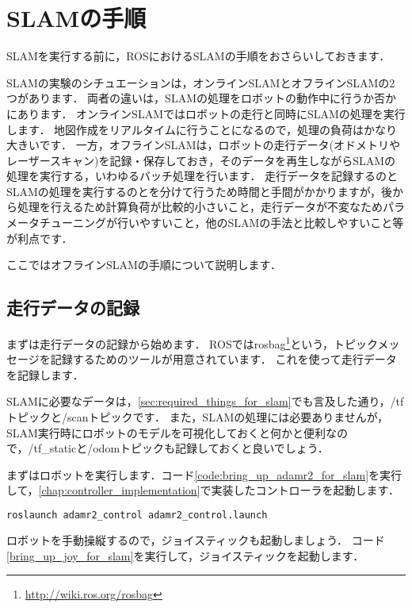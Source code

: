 \documentclass[{../../master}]{subfiles}
\begin{document}
\section{SLAMの手順}

SLAMを実行する前に，ROSにおけるSLAMの手順をおさらいしておきます．

SLAMの実験のシチュエーションは，オンラインSLAMとオフラインSLAMの2つがあります．
両者の違いは，SLAMの処理をロボットの動作中に行うか否かにあります．
オンラインSLAMではロボットの走行と同時にSLAMの処理を実行します．
地図作成をリアルタイムに行うことになるので，処理の負荷はかなり大きいです．
一方，オフラインSLAMは，ロボットの走行データ(オドメトリやレーザースキャン)を記録・保存しておき，そのデータを再生しながらSLAMの処理を実行する，いわゆるバッチ処理を行います．
走行データを記録するのとSLAMの処理を実行するのとを分けて行うため時間と手間がかかりますが，後から処理を行えるため計算負荷が比較的小さいこと，走行データが不変なためパラメータチューニングが行いやすいこと，他のSLAMの手法と比較しやすいこと等が利点です．

ここではオフラインSLAMの手順について説明します．

\subsection{走行データの記録}

まずは走行データの記録から始めます．
ROSでは\textsf{rosbag}\footnote{\url{http://wiki.ros.org/rosbag}}という，トピックメッセージを記録するためのツールが用意されています．
これを使って走行データを記録します．

SLAMに必要なデータは，\ref{sec:required_things_for_slam}でも言及した通り，\textsf{/tf}トピックと\textsf{/scan}トピックです．
また，SLAMの処理には必要ありませんが，SLAM実行時にロボットのモデルを可視化しておくと何かと便利なので，\textsf{/tf\_static}と\textsf{/odom}トピックも記録しておくと良いでしょう．

まずはロボットを実行します．コード\ref{code:bring_up_adamr2_for_slam}を実行して，\ref{chap:controller_implementation}で実装したコントローラを起動します．

\begin{lstlisting}[language=sh, label=code:bring_up_adamr2_for_slam, caption=Bring up ADAMR2]
roslaunch adamr2_control adamr2_control.launch
\end{lstlisting}

ロボットを手動操縦するので，ジョイスティックも起動しましょう．
コード\ref{bring_up_joy_for_slam}を実行して，ジョイスティックを起動します．
\end{document}
